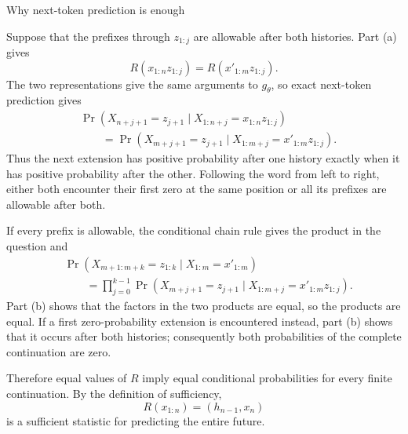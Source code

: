 \begin{exercise}[Extension]{Why next-token prediction is enough}
\begin{solution}
\begin{parts}
      \item Suppose that the prefixes through $z_{1:j}$ are allowable after
        both histories. Part (a) gives
        \[
          R(x_{1:n}z_{1:j})
            =R(x'_{1:m}z_{1:j}).
        \]
        The two representations give the same arguments to $g_\theta$, so
        exact next-token prediction gives
        \[
          \begin{aligned}
          &\Pr\!\left(
            X_{n+j+1}=z_{j+1}
            \mid X_{1:n+j}=x_{1:n}z_{1:j}
          \right)\\
          &\qquad=
          \Pr\!\left(
            X_{m+j+1}=z_{j+1}
            \mid X_{1:m+j}=x'_{1:m}z_{1:j}
          \right).
          \end{aligned}
        \]
        Thus the next extension has positive probability after one history
        exactly when it has positive probability after the other. Following
        the word from left to right, either both encounter their first zero at
        the same position or all its prefixes are allowable after both.

      \item If every prefix is allowable, the conditional chain rule gives
        the product in the question and
        \[
          \begin{aligned}
          &\Pr\!\left(
            X_{m+1:m+k}=z_{1:k}\mid X_{1:m}=x'_{1:m}
          \right)\\
          &\qquad=
          \prod_{j=0}^{k-1}
          \Pr\!\left(
            X_{m+j+1}=z_{j+1}
            \mid X_{1:m+j}=x'_{1:m}z_{1:j}
          \right).
          \end{aligned}
        \]
        Part (b) shows that the factors in the two products are equal, so the
        products are equal. If a first zero-probability extension is
        encountered instead, part (b) shows that it occurs after both
        histories; consequently both probabilities of the complete
        continuation are zero.

        Therefore equal values of $R$ imply equal conditional probabilities
        for every finite continuation. By the definition of sufficiency,
        \[
          R(x_{1:n})=(h_{n-1},x_n)
        \]
        is a sufficient statistic for predicting the entire future.
    \end{parts}
  \end{solution}
\end{exercise}
